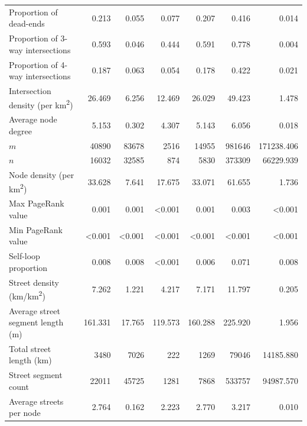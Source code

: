 \documentclass[Afour,sageh,times]{sagej}
\begin{document}
\begin{table}
\begin{tabular}{ l r r r r r r }
	Proportion of dead-ends                          & 0.213          & 0.055          & 0.077          & 0.207          & 0.416          & 0.014          \\
	Proportion of 3-way intersections                & 0.593          & 0.046          & 0.444          & 0.591          & 0.778          & 0.004          \\
	Proportion of 4-way intersections                & 0.187          & 0.063          & 0.054          & 0.178          & 0.422          & 0.021          \\
	Intersection density (per km\textsuperscript{2}) & 26.469         & 6.256          & 12.469         & 26.029         & 49.423         & 1.478          \\
	Average node degree                              & 5.153          & 0.302          & 4.307          & 5.143          & 6.056          & 0.018          \\
	$m$                                              & 40890          & 83678          & 2516           & 14955          & 981646         & 171238.406     \\
	$n$                                              & 16032          & 32585          & 874            & 5830           & 373309         & 66229.939      \\
	Node density (per km\textsuperscript{2})         & 33.628         & 7.641          & 17.675         & 33.071         & 61.655         & 1.736          \\
	Max PageRank value                               & 0.001          & 0.001          & \textless0.001 & 0.001          & 0.003          & \textless0.001 \\
	Min PageRank value                               & \textless0.001 & \textless0.001 & \textless0.001 & \textless0.001 & \textless0.001 & \textless0.001 \\
	Self-loop proportion                             & 0.008          & 0.008          & \textless0.001 & 0.006          & 0.071          & 0.008          \\
	Street density (km/km\textsuperscript{2})        & 7.262          & 1.221          & 4.217          & 7.171          & 11.797         & 0.205          \\
	Average street segment length (m)                & 161.331        & 17.765         & 119.573        & 160.288        & 225.920        & 1.956          \\
	Total street length (km)                         & 3480           & 7026           & 222            & 1269           & 79046          & 14185.880      \\
	Street segment count                             & 22011          & 45725          & 1281           & 7868           & 533757         & 94987.570      \\
	Average streets per node                         & 2.764          & 0.162          & 2.223          & 2.770          & 3.217          & 0.010          \\
	\bottomrule
\end{tabular}
\end{table}
\end{document}
